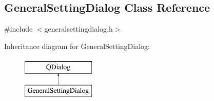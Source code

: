 \hypertarget{classGeneralSettingDialog}{}\subsection{General\+Setting\+Dialog Class Reference}
\label{classGeneralSettingDialog}


{\ttfamily \#include $<$generalsettingdialog.\+h$>$}

Inheritance diagram for General\+Setting\+Dialog\+:\begin{figure}[H]
\begin{center}
\leavevmode
\includegraphics[height=2.000000cm]{classGeneralSettingDialog}
\end{center}
\end{figure}

